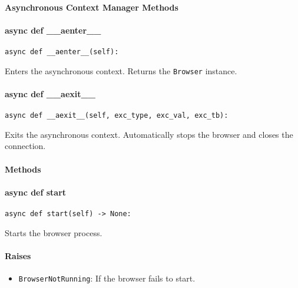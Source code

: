 \documentclass{article}
\begin{document}
\paragraph{Asynchronous Context Manager Methods}
\paragraph{async def \_\_aenter\_\_}

\begin{lstlisting}[style=pythonstyle]
async def __aenter__(self):
\end{lstlisting}

\noindent Enters the asynchronous context. Returns the \lstinline[style=pythonstyle]|Browser| instance.

\paragraph{async def \_\_aexit\_\_}

\begin{lstlisting}[style=pythonstyle]
async def __aexit__(self, exc_type, exc_val, exc_tb):
\end{lstlisting}

\noindent Exits the asynchronous context. Automatically stops the browser and closes the connection.

\paragraph{Methods}
\paragraph{async def start}

\begin{lstlisting}[style=pythonstyle]
async def start(self) -> None:
\end{lstlisting}

\noindent Starts the browser process.

\paragraph{Raises}

\begin{itemize}
    \item \lstinline[style=pythonstyle]|BrowserNotRunning|: If the browser fails to start.
\end{itemize}
\end{document}
